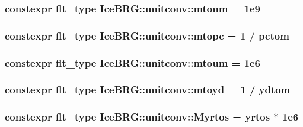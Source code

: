 \subsubsection[{mtonm}]{\setlength{\rightskip}{0pt plus 5cm}constexpr {\bf flt\+\_\+type} Ice\+B\+R\+G\+::unitconv\+::mtonm = 1e9}\label{namespaceIceBRG_1_1unitconv_a7f73f7a919a494076732759964c87efc}
\hypertarget{namespaceIceBRG_1_1unitconv_a8ca1be1d7bdd345038fed69eeb559ce0}{}
\subsubsection[{mtopc}]{\setlength{\rightskip}{0pt plus 5cm}constexpr {\bf flt\+\_\+type} Ice\+B\+R\+G\+::unitconv\+::mtopc = 1 / {\bf pctom}}\label{namespaceIceBRG_1_1unitconv_a8ca1be1d7bdd345038fed69eeb559ce0}
\hypertarget{namespaceIceBRG_1_1unitconv_a2f37d6dcda7953f12afa278778b7e256}{}
\subsubsection[{mtoum}]{\setlength{\rightskip}{0pt plus 5cm}constexpr {\bf flt\+\_\+type} Ice\+B\+R\+G\+::unitconv\+::mtoum = 1e6}\label{namespaceIceBRG_1_1unitconv_a2f37d6dcda7953f12afa278778b7e256}
\hypertarget{namespaceIceBRG_1_1unitconv_a63a2fb6c572e1d6c51b9b7ef2e1d4cac}{}
\subsubsection[{mtoyd}]{\setlength{\rightskip}{0pt plus 5cm}constexpr {\bf flt\+\_\+type} Ice\+B\+R\+G\+::unitconv\+::mtoyd = 1 / {\bf ydtom}}\label{namespaceIceBRG_1_1unitconv_a63a2fb6c572e1d6c51b9b7ef2e1d4cac}
\hypertarget{namespaceIceBRG_1_1unitconv_a291c0c3839a79c6f608064e64449f4d6}{}
\subsubsection[{Myrtos}]{\setlength{\rightskip}{0pt plus 5cm}constexpr {\bf flt\+\_\+type} Ice\+B\+R\+G\+::unitconv\+::\+Myrtos = {\bf yrtos} $\ast$ 1e6}\label{namespaceIceBRG_1_1unitconv_a291c0c3839a79c6f608064e64449f4d6}
\hypertarget{namespaceIceBRG_1_1unitconv_aae0bf919fb6de8ed11bac8da359c8581}{}
